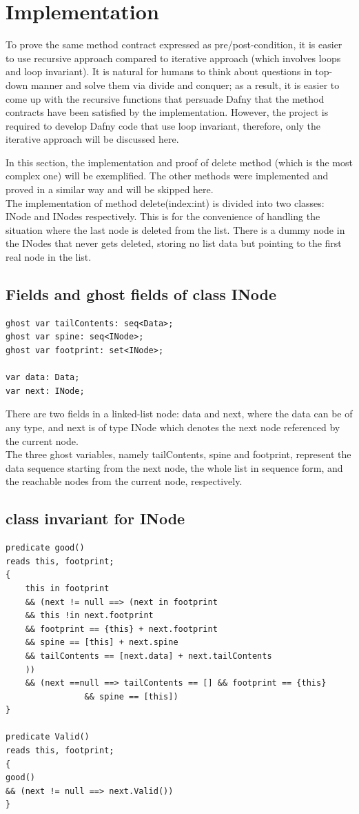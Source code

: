 \section*{Implementation}
To prove the same method contract expressed as pre/post-condition, it is easier to use recursive approach compared to iterative approach (which involves loops and loop invariant). It is natural for humans to think about questions in top-down manner and solve them via divide and conquer; as a result, it is easier to come up with the recursive functions that persuade Dafny that the method contracts have been satisfied by the implementation. However, the project is required to develop Dafny code that use loop invariant, therefore, only the iterative approach will be discussed here.

\bigskip
In this section, the implementation and proof of delete method (which is the most complex one) will be exemplified. The other methods were implemented and proved in a similar way and will be skipped here.\\

The implementation of method delete(index:int) is divided into two classes: INode and INodes respectively. This is for the convenience of handling the situation where the last node is deleted from the list. There is a dummy node in the INodes that never gets deleted, storing no list data but pointing to the first real node in the list.

\subsection*{Fields and ghost fields of class INode}
\begin{lstlisting}
ghost var tailContents: seq<Data>;
ghost var spine: seq<INode>;
ghost var footprint: set<INode>;

var data: Data;
var next: INode;
\end{lstlisting}

There are two fields in a linked-list node: data and next, where the data can be of any type, and next is of type INode which denotes the next node referenced by the current node.\\

The three ghost variables, namely tailContents, spine and footprint, represent the data sequence starting from the next node, the whole list in sequence form, and the reachable nodes from the current node, respectively.

\subsection*{class invariant for INode}
\begin{lstlisting}
predicate good()
reads this, footprint;
{
    this in footprint 
	&& (next != null ==> (next in footprint 
	&& this !in next.footprint 
	&& footprint == {this} + next.footprint
	&& spine == [this] + next.spine
	&& tailContents == [next.data] + next.tailContents
	))
	&& (next ==null ==> tailContents == [] && footprint == {this}
				&& spine == [this])
}

predicate Valid()
reads this, footprint;
{
good()  
&& (next != null ==> next.Valid())
}
\end{lstlisting}  


